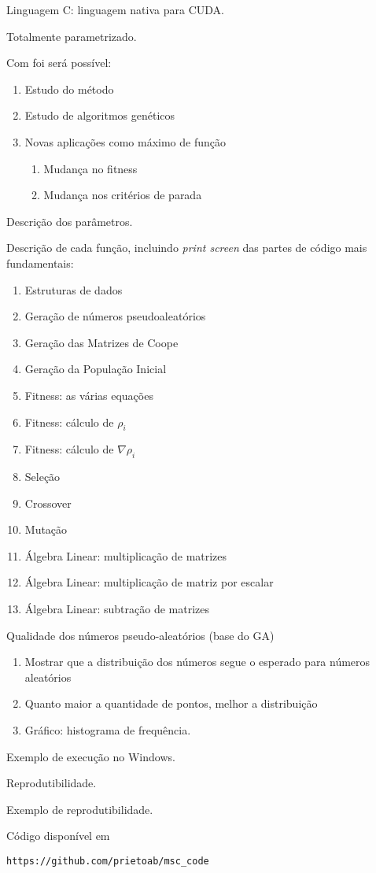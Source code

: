 	Linguagem C: linguagem nativa para CUDA.

	Totalmente parametrizado. 

	Com foi será possível:

	\begin{enumerate}
		\item Estudo do método 
		\item Estudo de algoritmos genéticos
		\item Novas aplicações como máximo de função
		\begin{enumerate}
			\item Mudança no fitness 
			\item Mudança nos critérios de parada
		\end{enumerate}	
	\end{enumerate}


	Descrição dos parâmetros.

	Descrição de cada função, incluindo \textit{print screen} das partes de código mais fundamentais:

	\begin{enumerate}
		\item Estruturas de dados
		\item Geração de números pseudoaleatórios
		\item Geração das Matrizes de Coope
		\item Geração da População Inicial
		\item Fitness: as várias equações
		\item Fitness: cálculo de $\rho_i$
		\item Fitness: cálculo de $\nabla\rho_i$
		\item Seleção
		\item Crossover
		\item Mutação
		\item Álgebra Linear: multiplicação de matrizes
		\item Álgebra Linear: multiplicação de matriz por escalar
		\item Álgebra Linear: subtração de matrizes
	\end{enumerate}

	Qualidade dos números pseudo-aleatórios (base do GA)
	
	

	\begin{enumerate}
			\item Mostrar que a distribuição dos números segue o esperado para números aleatórios
			\item Quanto maior a quantidade de pontos, melhor a distribuição
			\item Gráfico: histograma de frequência.
	\end{enumerate}

	Exemplo de execução no Windows.

	Reprodutibilidade.
	
	Exemplo de reprodutibilidade.

	Código disponível em

	\texttt{https://github.com/prietoab/msc\_code}